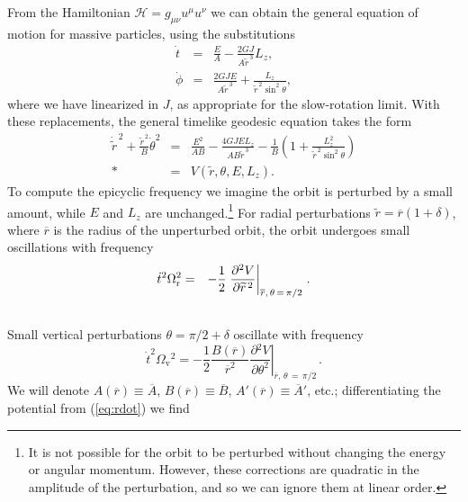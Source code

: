 \documentclass[aps,prd,amsfonts,amssymb,amsmath,nofootinbib,reprint,showpacs]{revtex4-1}
\newcommand{\eqnref}[1]{(\ref{eq:#1})}
\newcommand{\sub}[1]{\ensuremath{_\text{#1}}}
\newcommand{\partialdiff}[2]{\ensuremath{\frac{\partial {#1}}{\partial {#2}}}}
\newcommand{\recip}[1]{\ensuremath{\frac{1}{#1}}}
\begin{document}
From the Hamiltonian $\mathcal{H} = g_{\mu\nu}u^\mu u^\nu$ we can obtain the general equation of motion for massive particles, using the substitutions
\begin{eqnarray}
\dot{t} & = & \frac{E}{A} -\frac{2GJ}{A\widetilde{r}^{\,3}}L_z, \\
\dot{\phi} & = &  \frac{2GJE}{A\widetilde{r}^{\,3}} + \frac{L_z}{\widetilde{r}^{\,2} \sin^2\theta},
\end{eqnarray}
where we have linearized in $J$, as appropriate for the slow-rotation limit. With these replacements, the general timelike geodesic equation takes the form
\begin{eqnarray}
\dot{\widetilde{r}}^{\,2} + \frac{\widetilde{r}^{\,2}}{B} \dot{\theta}^2 & = & \frac{E^2}{AB} -\frac{4GJEL_z}{AB \widetilde{r}^{\,3}}- \recip{B}\left(1 + \frac{L_z^2}{\widetilde{r}^{\,2}\sin^2\theta}\right) \nonumber \\*
 & = & V(\widetilde{r},\theta,E,L_z).
\label{eq:rdot}
\end{eqnarray}
To compute the epicyclic frequency we imagine the orbit is perturbed by a small amount, while $E$ and $L_z$ are unchanged.\footnote{It is not possible for the orbit to be perturbed without changing the energy or angular momentum. However, these corrections are quadratic in the amplitude of the perturbation, and so we can ignore them at linear order.} For radial perturbations $\widetilde{r} = \overline{r}(1 + \delta)$, where $\overline{r}$ is the radius of the unperturbed orbit, the orbit undergoes small oscillations with frequency
\begin{eqnarray}
\dot{t}^2\Omega\sub{r}^2 & = & -\recip{2} \left. \partialdiff{^2 V}{\widetilde{r}^{\,2}}\right|_{\overline{r},\,\theta\,=\,\pi/2\,}.\\
 & & \vphantom{odd} \nonumber
\end{eqnarray}
Small vertical perturbations $\theta = \pi/2 + \delta$ oscillate with frequency
\begin{equation}
\dot{t}^2\Omega\sub{v}^2 = -\recip{2} \frac{B(\overline{r})}{\overline{r}^2} \left. \partialdiff{^2 V}{\theta^2}\right|_{\overline{r},\,\theta\,=\,\pi/2\,}.
\end{equation}
We will denote $A(\overline{r}) \equiv \overline{A}$, $B(\overline{r}) \equiv \overline{B}$, $A'(\overline{r}) \equiv \overline{A}'$, etc.; differentiating the potential from \eqnref{rdot} we find
\end{document}
